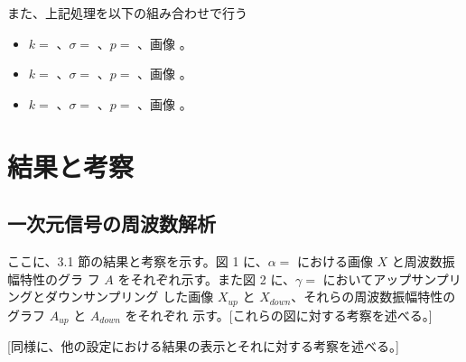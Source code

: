 \documentclass[dvipdfmx]{jsarticle}
\begin{document}
また、上記処理を以下の組み合わせで行う

\begin{itemize}
\item $k =$ 、$\sigma =$ 、$p =$ 、画像 。
\item $k =$ 、$\sigma =$ 、$p =$ 、画像 。
\item $k =$ 、$\sigma =$ 、$p =$ 、画像 。
\end{itemize}








\section{結果と考察}

\subsection{一次元信号の周波数解析}

ここに、3.1 節の結果と考察を示す。図 1 に、$\alpha =$ における画像 $X$ と周波数振幅特性のグラ
フ $A$ をそれぞれ示す。また図 2 に、$\gamma =$ においてアップサンプリングとダウンサンプリング
した画像 $X_{up}$ と $X_{down}$、それらの周波数振幅特性のグラフ $A_{up}$ と $A_{down}$ をそれぞれ
示す。[これらの図に対する考察を述べる。]

[同様に、他の設定における結果の表示とそれに対する考察を述べる。]




\end{document}
